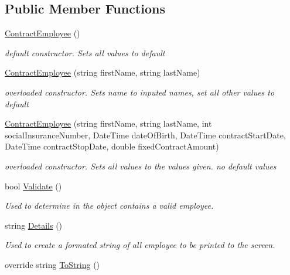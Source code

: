 \subsection*{Public Member Functions}
\begin{DoxyCompactItemize}
\item 
\hyperlink{class_all_employees_1_1_contract_employee_afb78892e913ff2a34aed4d7b78d6c9f7}{Contract\+Employee} ()
\begin{DoxyCompactList}\small\item\em default constructor. Sets all values to default \end{DoxyCompactList}\item 
\hyperlink{class_all_employees_1_1_contract_employee_ac7aa7412d0f08a2176da6e9fc0a1ddba}{Contract\+Employee} (string first\+Name, string last\+Name)
\begin{DoxyCompactList}\small\item\em overloaded constructor. Sets name to inputed names, set all other values to default \end{DoxyCompactList}\item 
\hyperlink{class_all_employees_1_1_contract_employee_a0dba534ea305dea916d77f54e4534d85}{Contract\+Employee} (string first\+Name, string last\+Name, int social\+Insurance\+Number, Date\+Time date\+Of\+Birth, Date\+Time contract\+Start\+Date, Date\+Time contract\+Stop\+Date, double fixed\+Contract\+Amount)
\begin{DoxyCompactList}\small\item\em overloaded constructor. Sets all values to the values given. no default values \end{DoxyCompactList}\item 
bool \hyperlink{class_all_employees_1_1_contract_employee_a826e3f824d86fb6b4cd1c527350c5b3a}{Validate} ()
\begin{DoxyCompactList}\small\item\em Used to determine in the object contains a valid employee. \end{DoxyCompactList}\item 
string \hyperlink{class_all_employees_1_1_contract_employee_adc3a5e1e3280ac1ec77d1a0767b95c19}{Details} ()
\begin{DoxyCompactList}\small\item\em Used to create a formated string of all employee to be printed to the screen. \end{DoxyCompactList}\item 
override string \hyperlink{class_all_employees_1_1_contract_employee_ae0ba5deffac9dcf5317c91fd7d7f8816}{To\+String} ()

\end{DoxyCompactItemize}
